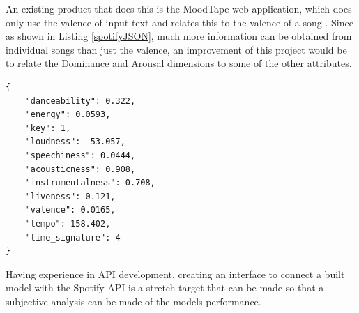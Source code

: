 An existing product that does this is the MoodTape web application, which does only use the valence of input text and relates this to the valence of a song  \cite{moodtape}. Since as shown in Listing \ref{spotifyJSON}, much more information can be obtained from individual songs than just the valence, an improvement of this project would be to relate the Dominance and Arousal dimensions to some of the other attributes.

\begin{lstlisting}[style=leftCode, caption={Some of the attributes of a song obtained through requesting information through the Spotify API},captionpos=b, label={spotifyJSON}]
{
    "danceability": 0.322,
    "energy": 0.0593,
    "key": 1,
    "loudness": -53.057,
    "speechiness": 0.0444,
    "acousticness": 0.908,
    "instrumentalness": 0.708,
    "liveness": 0.121,
    "valence": 0.0165,
    "tempo": 158.402,
    "time_signature": 4
}
\end{lstlisting}

Having experience in API development, creating an interface to connect a built model with the Spotify API is a stretch target that can be made so that a subjective analysis can be made of the models performance. 